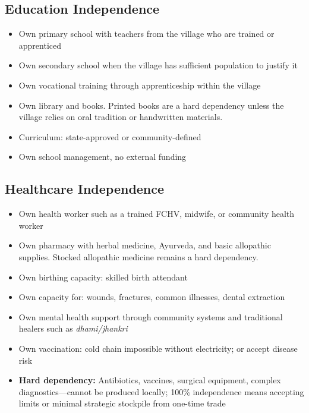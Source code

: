 \documentclass[11pt,a4paper]{article}
\begin{document}
\subsection{Education Independence}
\begin{itemize}
    \item Own primary school with teachers from the village who are trained or apprenticed
    \item Own secondary school when the village has sufficient population to justify it
    \item Own vocational training through apprenticeship within the village
    \item Own library and books. Printed books are a hard dependency unless the village relies on oral tradition or handwritten materials.
    \item Curriculum: state-approved or community-defined
    \item Own school management, no external funding
\end{itemize}

\subsection{Healthcare Independence}
\begin{itemize}
    \item Own health worker such as a trained FCHV, midwife, or community health worker
    \item Own pharmacy with herbal medicine, Ayurveda, and basic allopathic supplies. Stocked allopathic medicine remains a hard dependency.
    \item Own birthing capacity: skilled birth attendant
    \item Own capacity for: wounds, fractures, common illnesses, dental extraction
    \item Own mental health support through community systems and traditional healers such as \textit{dhami/jhankri}
    \item Own vaccination: cold chain impossible without electricity; or accept disease risk
    \item \textbf{Hard dependency:} Antibiotics, vaccines, surgical equipment, complex diagnostics---cannot be 
    produced locally; 100\% independence means accepting limits or minimal strategic stockpile from one-time trade
\end{itemize}
\end{document}
